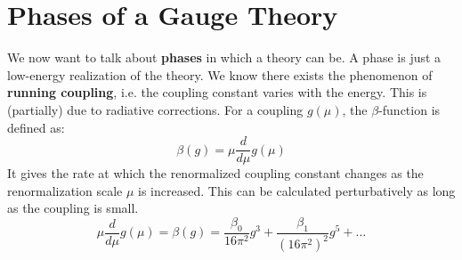 \documentclass[../main.tex]{subfiles}
\begin{document}
\section{Phases of a Gauge Theory}
We now want to talk about \textbf{phases} in which a theory can be. A phase is just a low-energy realization of the theory. We know there exists the phenomenon of \textbf{running coupling}, i.e. the coupling constant varies with the energy. This is (partially) due to radiative corrections. For a coupling $g(\mu)$, the $\beta$-function is defined as:
\[
\beta(g)=\mu\frac{d}{d\mu}g(\mu)
\]
It gives the rate at which the renormalized coupling constant changes as the renormalization scale $\mu$ is increased. This can be calculated perturbatively as long as the coupling is small.
\[
\mu\frac{d}{d\mu}g(\mu)=\beta(g)=\frac{\beta_0}{16\pi^2}g^3+\frac{\beta_1}{(16\pi^2)^2}g^5+\dots
\]
\end{document}
